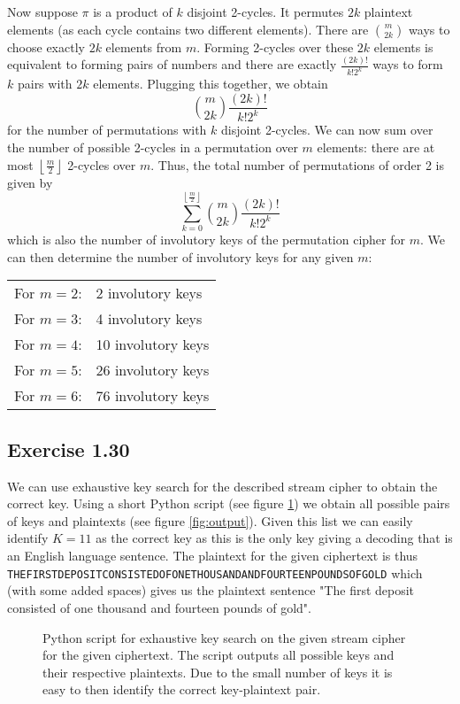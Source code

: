 \documentclass[12pt]{article}
\begin{document}
Now suppose $\pi$ is a product of $k$ disjoint 2-cycles. It permutes $2k$ plaintext elements (as each cycle contains two different elements). There are ${m \choose 2k}$ ways to choose exactly $2k$ elements from $m$. Forming 2-cycles over these $2k$ elements is equivalent to forming pairs of numbers and there are exactly $\frac{(2k)!}{k!2^k}$ ways to form $k$ pairs with $2k$ elements. Plugging this together, we obtain
$$
{m \choose 2k} \frac{(2k)!}{k!2^k}
$$
for the number of permutations with $k$ disjoint 2-cycles. We can now sum over the number of possible 2-cycles in a permutation over $m$ elements: there are at most $\left \lfloor \frac{m}{2} \right \rfloor$ 2-cycles over $m$. Thus, the total number of permutations of order 2 is given by
$$
\sum_{k=0}^{\left \lfloor \frac{m}{2} \right \rfloor} {m \choose 2k} \frac{(2k)!}{k!2^k}
$$
which is also the number of involutory keys of the permutation cipher for $m$. We can then determine the number of involutory keys for any given $m$:\\

\begin{tabular}{l l}
    For $m = 2$: & 2 involutory keys\\
    For $m = 3$: & 4 involutory keys\\
    For $m = 4$: & 10 involutory keys\\
    For $m = 5$: & 26 involutory keys\\
    For $m = 6$: & 76 involutory keys
\end{tabular}


\subsection*{Exercise 1.30}

We can use exhaustive key search for the described stream cipher to obtain the correct key. Using a short Python script (see figure \ref{fig:code}) we obtain all possible pairs of keys and plaintexts (see figure \ref{fig:output}). Given this list we can easily identify $K = 11$ as the correct key as this is the only key giving a decoding that is an English language sentence. The plaintext for the given ciphertext is thus \lstinline{ THEFIRSTDEPOSITCONSISTEDOFONETHOUSANDANDFOURTEENPOUNDSOFGOLD} which (with some added spaces) gives us the plaintext sentence "The first deposit consisted of one thousand and fourteen pounds of gold".

\begin{figure}
    \centering
    
    \caption{Python script for exhaustive key search on the given stream cipher for the given ciphertext. The script outputs all possible keys and their respective plaintexts. Due to the small number of keys it is easy to then identify the correct key-plaintext pair.}
    \label{fig:code}
\end{figure}
\end{document}
